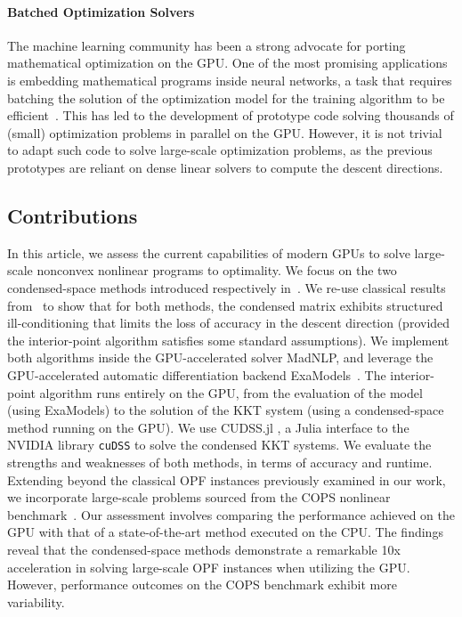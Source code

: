 \paragraph{Batched Optimization Solvers}
The machine learning community has been a strong advocate for porting
mathematical optimization on the GPU. One of the most promising
applications is embedding mathematical programs inside neural networks,
a task that requires batching the solution of the optimization model
for the training algorithm to be
efficient~\cite{amos2017optnet,pineda2022theseus}.  This has led to
the development of prototype code solving thousands of (small)
optimization problems in parallel on the GPU.  However, it is not
trivial to adapt such code to solve large-scale optimization problems,
as the previous prototypes are reliant on dense linear solvers to
compute the descent directions.


\subsection{Contributions}
In this article, we assess the current capabilities of modern GPUs
to solve large-scale nonconvex nonlinear programs to optimality.
We focus on the two condensed-space methods
introduced respectively in~\cite{regev2023hykkt,shin2023accelerating}.
We re-use classical results from~\cite{wright1998ill} to show
that for both methods, the condensed matrix exhibits
structured ill-conditioning that limits the loss of accuracy in
the descent direction (provided the interior-point algorithm satisfies
some standard assumptions).
We implement both algorithms inside the GPU-accelerated solver MadNLP,
and leverage the GPU-accelerated automatic differentiation
backend ExaModels~\cite{shin2023accelerating}.
The interior-point algorithm runs entirely on the GPU, from
the evaluation of the model (using ExaModels) to the solution of
the KKT system (using a condensed-space method running on the GPU).
We use CUDSS.jl \cite{Montoison_CUDSS}, a Julia interface to the NVIDIA library {\tt cuDSS} to solve
the condensed KKT systems.
We evaluate the strengths
and weaknesses of both methods, in terms of accuracy and runtime.
Extending beyond the classical OPF instances previously examined in our work, we incorporate large-scale problems sourced from the COPS nonlinear benchmark~\cite{dolan2004benchmarking}.
Our assessment involves comparing the performance achieved on the GPU with that of a state-of-the-art method executed on the CPU.
The findings reveal that the condensed-space methods demonstrate a remarkable 10x acceleration in solving large-scale OPF instances when utilizing the GPU.
However, performance outcomes on the COPS benchmark exhibit more variability.

